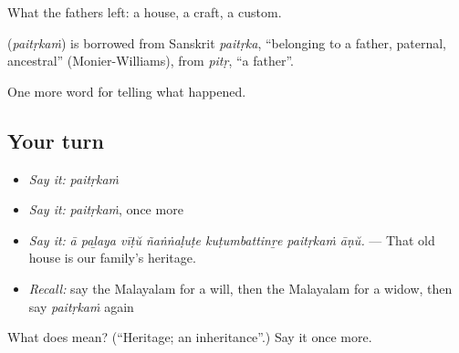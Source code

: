 What the fathers left: a house, a craft, a custom.

\begin{cousinweb}
\textbf{} (\emph{paitṛkaṁ}) is borrowed from Sanskrit \emph{paitṛka}, \textquotedblleft{}belonging to a father, paternal, ancestral\textquotedblright{} (Monier-Williams), from \emph{pitṛ}, \textquotedblleft{}a father\textquotedblright{}.
\end{cousinweb}

\begin{grammarlens}[title={What you've built}]
One more word for telling what happened.
\end{grammarlens}

\subsection*{Your turn}
\begin{itemize}
\raggedright
  \item \emph{Say it:} \emph{paitṛkaṁ}
  \item \emph{Say it:} \emph{paitṛkaṁ}, once more
  \item \emph{Say it:} \emph{ā paḻaya vīṭŭ ñaṅṅaḷuṭe kuṭumbattinṟe paitṛkaṁ āṇŭ.} — That old house is our family's heritage.
  \item \emph{Recall:} say the Malayalam for a will, then the Malayalam for a widow, then say \emph{paitṛkaṁ} again
\end{itemize}

\begin{tcolorbox}[breakable,colback=teal!4,colframe=teal!35!black,title={Before you move on}]
What does  mean? (\textquotedblleft{}Heritage; an inheritance\textquotedblright{}.) Say it once more.
\end{tcolorbox}
